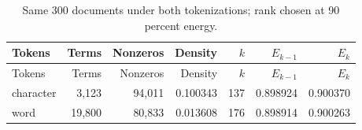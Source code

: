 {\small\renewcommand{\arraystretch}{1.05}
\begin{longtable}{lrrrrrr}
\caption{Same 300 documents under both tokenizations; rank chosen at 90 percent energy.}\\
\toprule
Tokens & Terms & Nonzeros & Density & $k$ & $E_{k-1}$ & $E_k$ \\ \midrule\endfirsthead
\toprule
Tokens & Terms & Nonzeros & Density & $k$ & $E_{k-1}$ & $E_k$ \\ \midrule\endhead
character & 3,123 & 94,011 & 0.100343 & 137 & 0.898924 & 0.900370 \\
word & 19,800 & 80,833 & 0.013608 & 176 & 0.898914 & 0.900263 \\
\bottomrule
\end{longtable}
}
